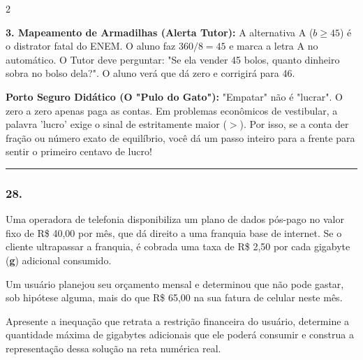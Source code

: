 \begin{multicols*}{2}
\begin{tcolorbox}[colback=CorTitUm!5, colframe=CorTitUm, boxrule=1pt, arc=4pt, left=6pt, right=6pt, top=6pt, bottom=6pt]
    \textbf{3. Mapeamento de Armadilhas (Alerta Tutor):} A alternativa A ($b \ge 45$) é o distrator fatal do ENEM. O aluno faz $360/8 = 45$ e marca a letra A no automático. O Tutor deve perguntar: "Se ela vender 45 bolos, quanto dinheiro sobra no bolso dela?". O aluno verá que dá zero e corrigirá para 46.
    \end{tcolorbox}
    \vspace{0.15cm}
    
    \begin{boxexplicacao}
    \textbf{Porto Seguro Didático (O "Pulo do Gato"):} "Empatar" não é "lucrar". O zero a zero apenas paga as contas. Em problemas econômicos de vestibular, a palavra 'lucro' exige o sinal de estritamente maior ($>$). Por isso, se a conta der fração ou número exato de equilíbrio, você dá um passo inteiro para a frente para sentir o primeiro centavo de lucro!
    \end{boxexplicacao}
\fi

\par\vspace{\espacoQuestao}


\noindent\textcolor{CorLinha}{\rule{\linewidth}{0.5pt}} 
\par\vspace{\espacoPreQuestao}
\subsubsection*{28.} 
\begin{enunciadoLiteral}
Uma operadora de telefonia disponibiliza um plano de dados pós-pago no valor fixo de R\$ 40,00 por mês, que dá direito a uma franquia base de internet. Se o cliente ultrapassar a franquia, é cobrada uma taxa de R\$ 2,50 por cada gigabyte (\textbf{g}) adicional consumido.

Um usuário planejou seu orçamento mensal e determinou que não pode gastar, sob hipótese alguma, mais do que R\$ 65,00 na sua fatura de celular neste mês.

Apresente a inequação que retrata a restrição financeira do usuário, determine a quantidade máxima de gigabytes adicionais que ele poderá consumir e construa a representação dessa solução na reta numérica real.
\end{enunciadoLiteral}


\end{multicols*}
